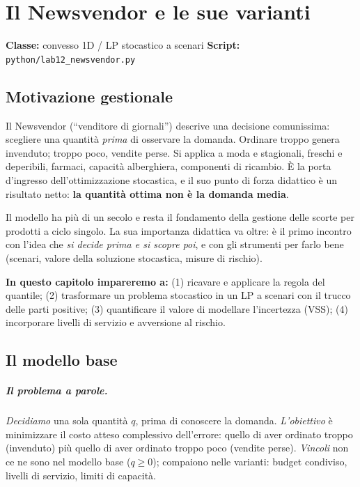 \chapter{Il Newsvendor e le sue varianti}
\label{cap:newsvendor}

\noindent\textbf{Classe:} convesso 1D / LP stocastico a scenari \hfill
\textbf{Script:} \texttt{python/lab12\_newsvendor.py}

\section{Motivazione gestionale}

Il Newsvendor (``venditore di giornali'') descrive una decisione comunissima:
scegliere una quantità \emph{prima} di osservare la domanda. Ordinare troppo genera
invenduto; troppo poco, vendite perse. Si applica a moda e stagionali, freschi e
deperibili, farmaci, capacità alberghiera, componenti di ricambio. È la porta
d'ingresso dell'ottimizzazione stocastica, e il suo punto di forza didattico è un
risultato netto: \textbf{la quantità ottima non è la domanda media}.



Il modello ha più di un secolo e resta il fondamento della gestione delle scorte
per prodotti a ciclo singolo. La sua importanza didattica va oltre: è il primo
incontro con l'idea che \emph{si decide prima e si scopre poi}, e con gli strumenti
per farlo bene (scenari, valore della soluzione stocastica, misure di rischio).

\textbf{In questo capitolo impareremo a:} (1) ricavare e applicare la regola del
quantile; (2) trasformare un problema stocastico in un LP a scenari con il trucco
delle parti positive; (3) quantificare il valore di modellare l'incertezza (VSS);
(4) incorporare livelli di servizio e avversione al rischio.

\section{Il modello base}

\paragraph{Il problema a parole.} \emph{Decidiamo} una sola quantità $q$, prima di
conoscere la domanda. \emph{L'obiettivo} è minimizzare il costo atteso complessivo
dell'errore: quello di aver ordinato troppo (invenduto) più quello di aver ordinato
troppo poco (vendite perse). \emph{Vincoli} non ce ne sono nel modello base ($q \ge 0$);
compaiono nelle varianti: budget condiviso, livelli di servizio, limiti di capacità.

